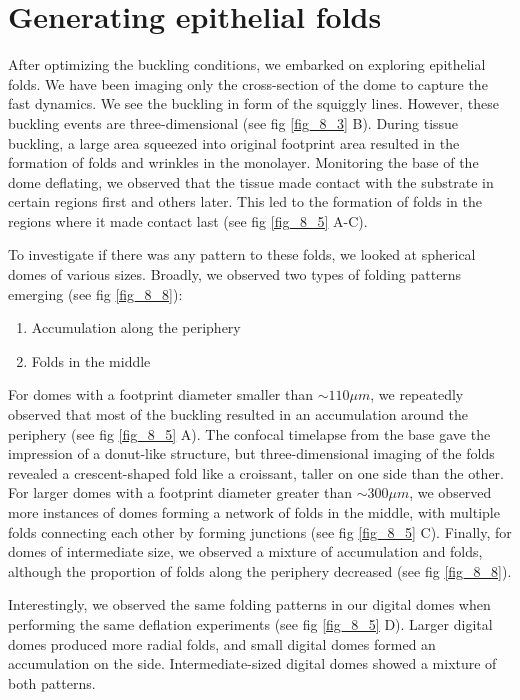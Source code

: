 \hypertarget{generating-epithelial-folds}{%
	\section{Generating epithelial
		folds}\label{generating-epithelial-folds}}

After optimizing the buckling conditions, we embarked on exploring epithelial folds. We have been imaging only the cross-section of the dome to capture the fast dynamics. We see the buckling in form of the squiggly lines. However, these buckling events are three-dimensional (see fig \ref{fig_8_3} B). During tissue buckling, a large area squeezed into original footprint area resulted in the formation of folds and wrinkles in the monolayer. Monitoring the base of the dome deflating, we observed that the tissue made contact with the substrate in certain regions first and others later. This led to the formation of folds in the regions where it made contact last (see fig \ref{fig_8_5} A-C).

To investigate if there was any pattern to these folds, we looked at spherical domes of various sizes. Broadly, we observed two types of folding patterns emerging (see fig \ref{fig_8_8}):

\begin{enumerate}
	\item Accumulation along the periphery
	\item Folds in the middle
\end{enumerate}

For domes with a footprint diameter smaller than $\sim 110 \mu m$, we repeatedly observed that most of the buckling resulted in an accumulation around the periphery (see fig \ref{fig_8_5} A). The confocal timelapse from the base gave the impression of a donut-like structure, but three-dimensional imaging of the folds revealed a crescent-shaped fold like a croissant, taller on one side than the other. For larger domes with a footprint  diameter greater than $\sim 300 \mu m$, we observed more instances of domes forming a network of folds in the middle, with multiple folds connecting each other by forming junctions (see fig \ref{fig_8_5} C). Finally, for domes of intermediate size, we observed a mixture of accumulation and folds, although the proportion of folds along the periphery decreased (see fig \ref{fig_8_8}).

Interestingly, we observed the same folding patterns in our digital domes when performing the same deflation experiments (see fig \ref{fig_8_5} D). Larger digital domes produced more radial folds, and small digital domes formed an accumulation on the side. Intermediate-sized digital domes showed a mixture of both patterns.

